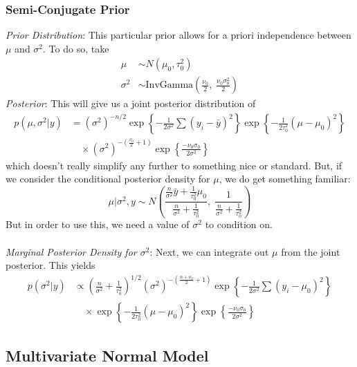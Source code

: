 \documentclass[12pt]{article}
\begin{document}
\newpage
\subsubsection{Semi-Conjugate Prior}

{\sl Prior Distribution}:
This particular prior allows for a priori independence between
$\mu$ and $\sigma^2$. To do so, take
\begin{align*}
   \mu &\sim N(\mu_0, \tau_0^2)\\
   \sigma^2 &\sim \text{InvGamma}\left(\frac{\nu_0}{2}, \; \frac{\nu_0
      \sigma_0^2}{2}\right)
\end{align*}
{\sl Posterior}: This will give us a joint posterior distribution of 
\begin{align*}
   p(\mu, \sigma^2 | y) &= (\sigma^2)^{-n/2} \exp\left\{
      -\frac{1}{2\sigma^2} \sum (y_i - \bar{y})^2 \right\}
      \exp\left\{ -\frac{1}{2\tau_0^2} (\mu-\mu_0)^2\right\} \\
      &\quad \times (\sigma^2)^{-\left(\frac{\nu_0}{2} +1\right)} 
      \exp\left\{ \frac{-\nu_0\sigma_0}{2\sigma^2}\right\}
\end{align*}
which doesn't really simplify any further to something nice or standard.
But, if we consider the conditional posterior density for $\mu$, we
do get something familiar:
   \[ \mu | \sigma^2, y \sim N\left(\frac{\frac{n}{\sigma^2} \bar{y}
     +\frac{1}{\tau_0^2}\mu_0}{\frac{n}{\sigma^2} + \frac{1}{\tau_0^2}},
       \; \frac{1}{\frac{n}{\sigma^2} + 
       \frac{1}{\tau_0^2}}\right) \]
But in order to use this, we need a value of $\sigma^2$ to condition on.
\\
\\
\emph{Marginal Posterior Density for $\sigma^2$}: 
Next, we can integrate out $\mu$ from the joint posterior. This yields
\begin{align*}
   p(\sigma^2 | y)&\propto \left(\frac{n}{\sigma^2} + \frac{1}{\tau_0^2}
   \right)^{1/2}  (\sigma^2)^{-\left(\frac{n+\nu_0}{2}+1\right)}
    \exp\left\{
      -\frac{1}{2\sigma^2} \sum (y_i - \mu_0)^2 \right\}\\
     &\quad \times\exp\left\{ -\frac{1}{2\tau_0^2} (\mu-\mu_0)^2\right\}
      \exp\left\{ \frac{-\nu_0\sigma_0}{2\sigma^2}\right\}
\end{align*}


\newpage
\subsection{Multivariate Normal Model}
\end{document}

